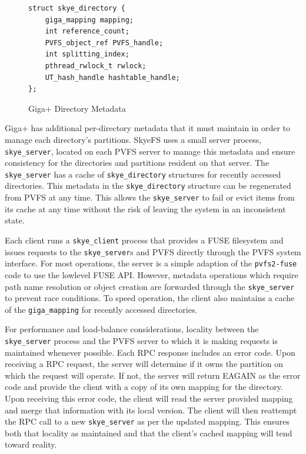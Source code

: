 \documentclass[twocolumn,letterpaper]{article}
\newcommand{\code}[1]{\texttt{#1}}
\begin{document}
\begin{figure}
\begin{lstlisting}
struct skye_directory {
    giga_mapping mapping;
    int reference_count;
    PVFS_object_ref PVFS_handle;
    int splitting_index;
    pthread_rwlock_t rwlock;
    UT_hash_handle hashtable_handle;
};
\end{lstlisting}
\caption{Giga+ Directory Metadata}
\label{fig:skyedir}
\end{figure}

Giga+ has additional per-directory metadata that it must maintain in order to
manage each directory's partitions.  SkyeFS uses a small server process,
\code{skye\_server}, located on each PVFS server to manage this metadata and
ensure consistency for the directories and partitions resident on that server.
The \code{skye\_server} has a cache of \code{skye\_directory} structures for
recently accessed directories.  This metadata in the \code{skye\_directory}
structure can be regenerated from PVFS at any time.  This allows the
\code{skye\_server} to fail or evict items from its cache at any time without
the risk of leaving the system in an inconsistent state.

Each client runs a \code{skye\_client} process that provides a FUSE filesystem
and issues requests to the \code{skye\_server}s and PVFS directly through the
PVFS system interface.  For most operations, the server is a simple adaption
of the \code{pvfs2-fuse} code to use the lowlevel FUSE API.  However, metadata
operations which require path name resolution or object creation are forwarded
through the \code{skye\_server} to prevent race conditions.  To speed
operation, the client also maintains a cache of the \code{giga\_mapping} for
recently accessed directories.

For performance and load-balance considerations, locality between the
\code{skye\_\-server} process and the PVFS server to which it is making
requests is maintained whenever possible.  Each RPC response includes an error
code.  Upon receiving a RPC request, the server will determine if it owns the
partition on which the request will operate.  If not, the server will return
EAGAIN as the error code and provide the client with a copy of its own mapping
for the directory.  Upon receiving this error code, the client will read the
server provided mapping and merge that information with its local version.
The client will then reattempt the RPC call to a new \code{skye\_\-server} as
per the updated mapping.  This ensures both that locality as maintained and
that the client's cached mapping will tend toward reality.
\end{document}
